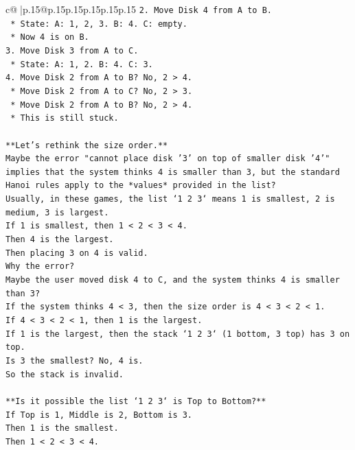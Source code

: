 \documentclass{article}
\begin{document}
{\begin{supertabular}{c@{$\;$}|p{.15\linewidth}@{}p{.15\linewidth}p{.15\linewidth}p{.15\linewidth}p{.15\linewidth}p{.15\linewidth}}
{{{\texttt{2.  Move Disk 4 from A to B.} \\
\texttt{    *   State: A: 1, 2, 3. B: 4. C: empty.} \\
\texttt{    *   Now 4 is on B.} \\
\texttt{3.  Move Disk 3 from A to C.} \\
\texttt{    *   State: A: 1, 2. B: 4. C: 3.} \\
\texttt{4.  Move Disk 2 from A to B? No, 2 > 4.} \\
\texttt{    *   Move Disk 2 from A to C? No, 2 > 3.} \\
\texttt{    *   Move Disk 2 from A to B? No, 2 > 4.} \\
\texttt{    *   This is still stuck.} \\
\\ 
\texttt{**Let's rethink the size order.**} \\
\texttt{Maybe the error "cannot place disk '3' on top of smaller disk '4'" implies that the system thinks 4 is smaller than 3, but the standard Hanoi rules apply to the *values* provided in the list?} \\
\texttt{Usually, in these games, the list `1 2 3` means 1 is smallest, 2 is medium, 3 is largest.} \\
\texttt{If 1 is smallest, then 1 < 2 < 3 < 4.} \\
\texttt{Then 4 is the largest.} \\
\texttt{Then placing 3 on 4 is valid.} \\
\texttt{Why the error?} \\
\texttt{Maybe the user moved disk 4 to C, and the system thinks 4 is smaller than 3?} \\
\texttt{If the system thinks 4 < 3, then the size order is 4 < 3 < 2 < 1.} \\
\texttt{If 4 < 3 < 2 < 1, then 1 is the largest.} \\
\texttt{If 1 is the largest, then the stack `1 2 3` (1 bottom, 3 top) has 3 on top.} \\
\texttt{Is 3 the smallest? No, 4 is.} \\
\texttt{So the stack is invalid.} \\
\\ 
\texttt{**Is it possible the list `1 2 3` is Top to Bottom?**} \\
\texttt{If Top is 1, Middle is 2, Bottom is 3.} \\
\texttt{Then 1 is the smallest.} \\
\texttt{Then 1 < 2 < 3 < 4.} \\
}}}
\end{supertabular}}
\end{document}
